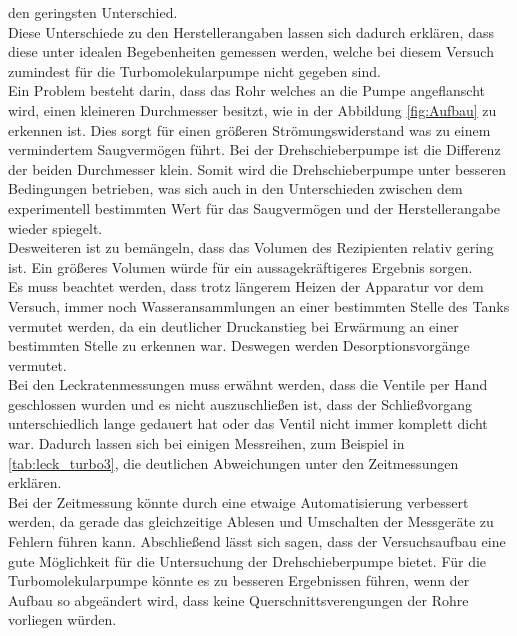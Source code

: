 den geringsten Unterschied.\\
Diese Unterschiede zu den Herstellerangaben lassen sich dadurch erklären, dass
diese unter idealen Begebenheiten gemessen werden, welche bei diesem Versuch zumindest
für die Turbomolekularpumpe nicht gegeben sind.\\
Ein Problem besteht darin, dass das Rohr welches an die Pumpe angeflanscht wird,
einen kleineren Durchmesser besitzt, wie in der Abbildung \ref{fig:Aufbau} zu erkennen ist. Dies sorgt für
einen größeren Strömungswiderstand was zu einem vermindertem Saugvermögen führt.
Bei der Drehschieberpumpe ist die Differenz der beiden Durchmesser klein. Somit wird die Drehschieberpumpe unter besseren Bedingungen
betrieben, was sich auch in den Unterschieden zwischen dem experimentell bestimmten Wert für das Saugvermögen
und der Herstellerangabe wieder spiegelt.\\
Desweiteren ist zu bemängeln, dass das Volumen des Rezipienten relativ gering ist. Ein größeres Volumen würde für ein
aussagekräftigeres Ergebnis sorgen.\\
Es muss beachtet werden, dass trotz längerem Heizen der Apparatur vor dem Versuch, immer noch Wasseransammlungen an einer bestimmten Stelle
des Tanks vermutet werden, da ein deutlicher Druckanstieg bei Erwärmung an einer bestimmten Stelle zu erkennen war.
Deswegen werden Desorptionsvorgänge vermutet.\\
Bei den Leckratenmessungen muss erwähnt werden, dass die Ventile per Hand geschlossen wurden und es nicht auszuschließen ist,
dass der Schließvorgang unterschiedlich lange gedauert hat oder das Ventil nicht immer komplett dicht war. Dadurch lassen
sich bei einigen Messreihen, zum Beispiel in \ref{tab:leck_turbo3}, die deutlichen Abweichungen unter den Zeitmessungen erklären.\\
Bei der Zeitmessung könnte durch eine etwaige Automatisierung verbessert werden, da gerade das gleichzeitige Ablesen und Umschalten der
Messgeräte zu Fehlern führen kann.
Abschließend lässt sich sagen, dass der Versuchsaufbau eine gute Möglichkeit für die Untersuchung der Drehschieberpumpe bietet.
Für die Turbomolekularpumpe könnte es zu besseren Ergebnissen führen, wenn der Aufbau so abgeändert wird, dass keine Querschnittsverengungen
der Rohre vorliegen würden.
